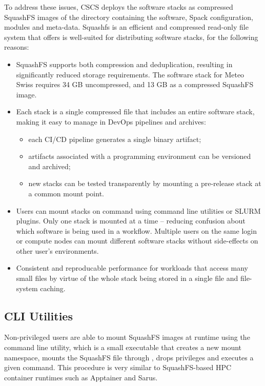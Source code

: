 To address these issues, CSCS deploys the software stacks as compressed SquashFS images of the directory containing the software, Spack configuration, modules and meta-data.
Squashfs is an efficient and compressed read-only file system that offers is well-suited for distributing software stacks, for the following reasons:
\begin{itemize}
    \item SquashFS supports both compression and deduplication, resulting in significantly reduced storage requirements.
          The software stack for Meteo Swiss requires 34 GB uncompressed, and 13 GB as a compressed SquashFS image.
    \item Each stack is a single compressed file that includes an entire software stack, making it easy to manage in DevOps pipelines and archives:
    \begin{itemize}
        \item each CI/CD pipeline generates a single binary artifact;
        \item artifacts associated with a programming environment can be versioned and archived;
        \item new stacks can be tested transparently by mounting a pre-release stack at a common mount point.
    \end{itemize}
    \item Users can mount stacks on command using command line utilities or SLURM plugins.
        Only one stack is mounted at a time -- reducing confusion about which software is being used in a workflow.
        Multiple users on the same login or compute nodes can mount different software stacks without side-effects on other user's environments.
    \item Consistent and reproducable performance for workloads that access many small files by virtue of the whole stack being stored in a single file and file-system caching.
\end{itemize}

\subsection{CLI Utilities}

Non-privileged users are able to mount SquashFS images at runtime using the  command line utility, which is a small  executable that creates a new mount namespace, mounts the SquashFS file through , drops privileges and executes a given command.
This procedure is very similar to SquashFS-based HPC container runtimes such as Apptainer and Sarus.


